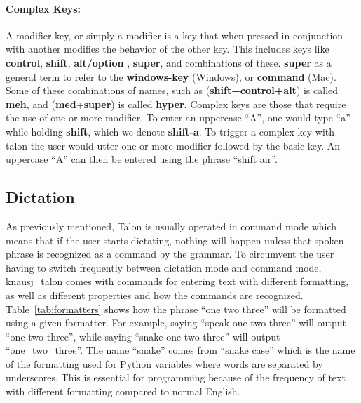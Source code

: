 \documentclass[../thesis.tex]{subfiles}
\begin{document}
\paragraph{Complex Keys:}
A modifier key, or simply a modifier is a key that when pressed in conjunction with another
modifies the behavior of the other key. This includes keys like \textbf{control}, \textbf{shift}, \textbf{alt/option}
, \textbf{super}, and combinations of these. \textbf{super} as a general term to refer to the \textbf{windows-key} (Windows), or \textbf{command} (Mac). Some of these combinations of names, such as (\textbf{shift+control+alt})
is called \textbf{meh}, and (\textbf{med}+\textbf{super}) is called \textbf{hyper}.
Complex keys are those that require the use of one or more modifier.
To enter an uppercase ``A'', one would type ``a'' while holding \textbf{shift}, which we denote \textbf{shift-a}.
To trigger a complex key with talon the user would utter one or more modifier followed by the basic key.
An uppercase ``A'' can then be entered using the phrase ``shift air''.

\subsection{Dictation}
As previously mentioned, Talon is usually operated in command mode
which means that if the user starts dictating, nothing will happen
unless that spoken phrase is recognized as a command by the grammar.
To circumvent the user having to switch frequently between dictation mode and command mode,
knausj\_talon comes with commands for entering text with different formatting, as well as
different properties and how the commands are recognized.
Table~\ref{tab:formatters} shows how the phrase ``one two three'' will be formatted using a given formatter.
For example, saying ``speak one two three'' will output ``one two three'', while saying ``snake one two three''
will output ``one\_two\_three''. The name ``snake'' comes from ``snake case'' which is the name of the formatting
used for Python variables where words are separated by underscores.
This is essential for programming because of the frequency of text with different formatting compared to
normal English.
\end{document}
